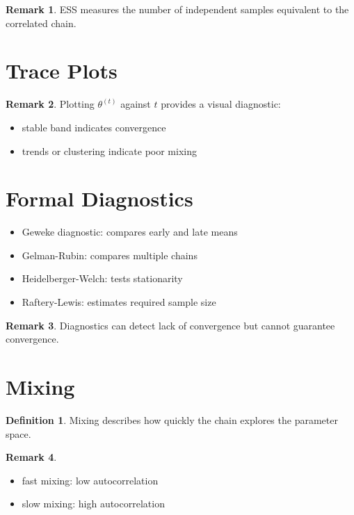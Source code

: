 \documentclass[12pt,oneside]{book}
\numberwithin{equation}{section}
\theoremstyle{definition}
\newtheorem{definition}{Definition}[section]
\newtheorem{remark}{Remark}[section]
\theoremstyle{plain}
\theoremstyle{remark}
\begin{document}
\begin{remark}
ESS measures the number of independent samples equivalent to the correlated chain.
\end{remark}

\section{Trace Plots}

\begin{remark}
Plotting $\theta^{(t)}$ against $t$ provides a visual diagnostic:
\begin{itemize}
\item stable band indicates convergence
\item trends or clustering indicate poor mixing
\end{itemize}
\end{remark}

\section{Formal Diagnostics}

\begin{itemize}
\item Geweke diagnostic: compares early and late means
\item Gelman-Rubin: compares multiple chains
\item Heidelberger-Welch: tests stationarity
\item Raftery-Lewis: estimates required sample size
\end{itemize}

\begin{remark}
Diagnostics can detect lack of convergence but cannot guarantee convergence.
\end{remark}

\section{Mixing}

\begin{definition}
Mixing describes how quickly the chain explores the parameter space.
\end{definition}

\begin{remark}
\begin{itemize}
\item fast mixing: low autocorrelation
\item slow mixing: high autocorrelation
\end{itemize}
\end{remark}
\end{document}
